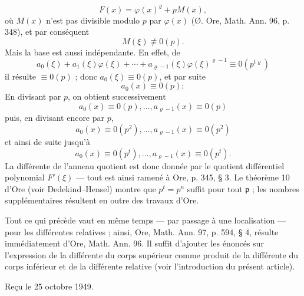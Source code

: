 \[
F(x)=\varphi(x)^\varrho+pM(x),
\]
où $M(x)$ n'est pas divisible modulo $p$ par $\varphi(x)$ (Ø. Ore, Math. Ann. 96, p. 348), et par conséquent
\[
M(\xi)\not\equiv0(p).
\]
Mais la base est aussi indépendante. En effet, de
\[
a_0(\xi)+a_1(\xi)\varphi(\xi)+\cdots+a_{\varrho-1}(\xi)\varphi(\xi)^{\varrho-1}
\equiv0(p^{t\varrho})
\]
il résulte $\equiv0(p)$ ; donc $a_0(\xi)\equiv0(p)$, et par suite
\[
a_0(x)\equiv0(p);
\]
En divisant par $p$, on obtient successivement
\[
a_0(x)\equiv0(p),\ldots,a_{\varrho-1}(x)\equiv0(p)
\]
puis, en divisant encore par $p$,
\[
a_0(x)\equiv0(p^2),\ldots,a_{\varrho-1}(x)\equiv0(p^2)
\]
et ainsi de suite jusqu'à
\[
a_0(x)\equiv0(p^t),\ldots,a_{\varrho-1}(x)\equiv0(p^t).
\]
La différente de l'anneau quotient est donc donnée par le quotient différentiel polynomial $F'(\xi)$ --- tout est ainsi ramené à Ore, p. 345, \S{} 3. Le théorème 10 d'Ore (voir Dedekind--Hensel) montre que $p^t=p^n$ suffit pour tout $\mathfrak p$ ; les nombres supplémentaires résultent en outre des travaux d'Ore.

Tout ce qui précède vaut en même temps --- par passage à une localisation --- pour les différentes relatives ; ainsi, Ore, Math. Ann. 97, p. 594, \S{} 4, résulte immédiatement d'Ore, Math. Ann. 96. Il suffit d'ajouter les énoncés sur l'expression de la différente du corps supérieur comme produit de la différente du corps inférieur et de la différente relative (voir l'introduction du présent article).

\begin{center}
Reçu le 25 octobre 1949.
\end{center}
